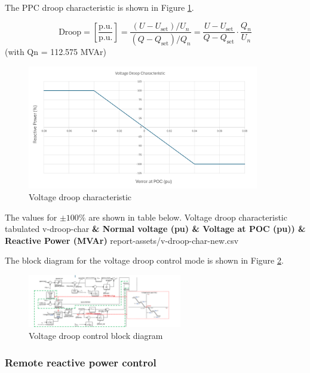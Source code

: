 \documentclass{../grid-link-report}
\begin{document}
	
	The PPC droop characteristic is shown in Figure \ref{fig:vdroop-char}.
	
	\[
	\text{Droop} =  \left[ \frac{\text{p.u.}}{\text{p.u.}} \right] = \frac{(U - U_{\text{set}})/U_n}{(Q - Q_{\text{set}})/Q_n} = \frac{U - U_{\text{set}}}{Q - Q_{\text{set}}} \cdot \frac{Q_n}{U_n}
	\]
	(with Qn = 112.575 MVAr)
	
	\begin{figure}[H]
		\centering
		\includegraphics[width=0.9\textwidth]{report-assets/images/vdroop-char.png}
		\caption{Voltage droop characteristic}
		\label{fig:vdroop-char}
	\end{figure}
	
	The values for $\pm 100 \%$ are shown in table below.
	{Voltage droop characteristic tabulated}
	{v-droop-char}
	{\bfseries \color{white} & \bfseries \color{white}Normal voltage (pu) & \bfseries \color{white}Voltage at POC (pu)) & \bfseries \color{white}Reactive Power (MVAr)}
	{report-assets/v-droop-char-new.csv}
	
	The block diagram for the voltage droop control mode is shown in Figure \ref{fig:vdroop-block-diagram}.
	
	\begin{figure}[H]
		\centering
		\includegraphics[width=0.6\textwidth]{report-assets/images/vdroop-mode-block-diagram.png}
		\caption{Voltage droop control block diagram}
		\label{fig:vdroop-block-diagram}
	\end{figure}
	
	\subsubsection{Remote reactive power control}
	
\end{document}
